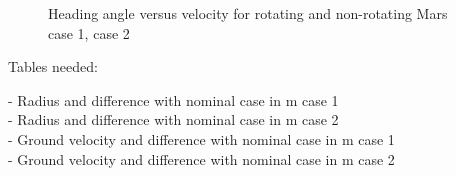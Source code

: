 \begin{figure}[H]
\centering
{} 
\caption{Heading angle versus velocity for rotating and non-rotating Mars \protect{} case 1,  \protect{} case 2 } 
\label{fig:headingAngleVsVelocityCase1combined} 
\end{figure}


Tables needed:

- Radius and difference with nominal case in m case 1 \\
- Radius and difference with nominal case in m case 2 \\
- Ground velocity and difference with nominal case in m case 1 \\
- Ground velocity and difference with nominal case in m case 2 \\
